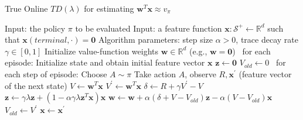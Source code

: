 \documentclass[12pt,a4paper]{article}
\begin{document}
\begin{algorithm}
\caption{True Online $TD(\lambda)$ for estimating $\mathbf{w}^{T}\mathbf{x} \approx v_{\pi}$}
\begin{algorithmic}
	\State Input: the policy $\pi$ to be evaluated
 	\State Input: a feature function $\mathbf{x}:\mathcal{S}^{+} \leftarrow \mathbb{R}^{d}$ such that $\mathbf{x}(terminal, \cdot) = \mathbf{0}$
	\State Algorithm parameters: step size $\alpha > 0$, trace decay rate $\gamma \in [0, 1]$
	\State Initialize value-function weights $\mathbf{w} \in \mathbb{R}^{d}$ (e.g., $\mathbf{w} = \mathbf{0}$)
	\State
	\Loop\ for each episode:
		\State Initialize state and obtain initial feature vector $\mathbf{x}$
		\State $\mathbf{z} \leftarrow \mathbf{0}$
		\State $V_{old} \leftarrow 0$
		\Repeat\ for each step of episode:
			\State Choose $A \sim \pi$
			\State Take action $A$, observe $R, \mathbf{x}^{'}$ (feature vector of the next state)
			\State $V \leftarrow \mathbf{w}^{T}\mathbf{x}$
			\State $V^{'} \leftarrow \mathbf{w}^{T}\mathbf{x}$
			\State $\delta \leftarrow R + \gamma V^{'} - V$
			\State $\mathbf{z} \leftarrow \gamma\lambda\mathbf{z} + (1 - \alpha\gamma\lambda\mathbf{z}^{T}\mathbf{x})\mathbf{x}$
			\State $\mathbf{w} \leftarrow \mathbf{w} + \alpha(\delta + V - V_{old})\mathbf{z} - \alpha(V - V_{old})\mathbf{x}$
			\State $V_{old} \leftarrow V^{'}$
			\State $\mathbf{x} \leftarrow \mathbf{x}^{'}$	
			
	\EndLoop
\end{algorithmic}
\end{algorithm}

\newpage
\end{document}
